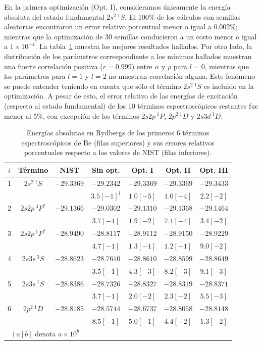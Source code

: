 En la primera optimización (Opt. I), consideramos únicamente la energía
absoluta del estado fundamental $2s^2\,^1S$. El 100\% de los cálculos con
semillas aleatorias encontraron un error relativo porcentual menor o 
igual a 0.002\%; mientras que la optimización de 30 semillas conducieron 
a un costo menor o igual a $1\times 10^{-4}$. La tabla~\ref{tab:optpol} 
muestra los mejores resultados hallados. Por otro lado, la distribución 
de los parámetros correspondiente a los mínimos hallados muestran una 
fuerte correlación positiva ($r=0.999$) entre $\alpha $ y $\rho$ para 
$l=0$, mientras que los parámetros para $l=1$ y $l=2$ no muestran 
correlación alguna. Este fenómeno se puede entender teniendo en cuenta 
que sólo el término $2s^2\,^1S$ es incluido en la optimización. A pesar 
de esto, el error relativo de las energías de excitación (respecto al 
estado fundamental) de los 10 términos espectroscópicos restantes fue 
menor al 5\%, con excepción de los términos $2s2p\,^1P$, $2p^2\,^1D$ y 
$2s3d\,^1D$.

\begin{table}
\centering
\begin{tabular}{|*{7}{c|}}
\hline 
$i$ & Término   & NIST & Sin opt.   & Opt. I       & Opt. II      & Opt. III \\
\hline 
\hline 
\rowcolor{mygray} 1 &$2s^2\,^1S$  & $-29.3369$ & $-29.2342$ & $-29.3369$ & $-29.3369$ & $-29.3433$ \\
 & & & $3.5[-1]^\dagger$ & $1.0[-5]$  & $1.0[-4]$  & $2.2[-2]$  \\
\rowcolor{mygray} 2 &$2s2p\,^3P^*$& $-29.1366$ & $-29.0302$ & $-29.1310$ & $-29.1368$ & $-29.1464$ \\
  &       & & $3.7[-1]$  & $1.9[-2]$  & $7.1[-4]$  & $3.4[-2]$  \\
\rowcolor{mygray} 3 &$2s2p\,^1P^*$& $-28.9490$ & $-28.8117$ & $-28.9112$ & $-28.9150$ & $-28.9229$ \\
  &       & & $4.7[-1]$  & $1.3[-1]$  & $1.2[-1]$  & $9.0[-2]$  \\
\rowcolor{mygray} 4 &$2s3s\,^3S$  & $-28.8623$ & $-28.7610$ & $-28.8610$ & $-28.8599$ & $-28.8649$ \\
  &       & & $3.5[-1]$  & $4.3[-3]$  & $8.2[-3]$  & $9.1[-3]$  \\
\rowcolor{mygray} 5 &$2s3s\,^1S$  & $-28.8386$ & $-28.7326$ & $-28.8327$ & $-28.8319$ & $-28.8371$ \\
  &       & & $3.7[-1]$  & $2.0[-2]$  & $2.3[-2]$  & $5.5[-3]$  \\
\rowcolor{mygray} 6 &$2p^2\,^1D$  & $-28.8185$ & $-28.5744$ & $-28.6737$ & $-28.8058$ & $-28.8148$ \\
  &       & & $8.5[-1]$  & $5.0[-1]$  & $4.4[-2]$  & $1.3[-2]$  \\
\hline\multicolumn{3}{c}{$\dagger\,a[b]$ denota $a\times 10^b$} \\
\end{tabular}
\caption[Energías absolutas de Be.]
{Energías absolutas en Rydbergs de los primeros 6 términos espectroscópicos 
de Be (filas superiores) y sus errores relativos porcentuales respecto a 
los valores de NIST (filas inferiores).}
\label{tab:optpol}
\end{table}

